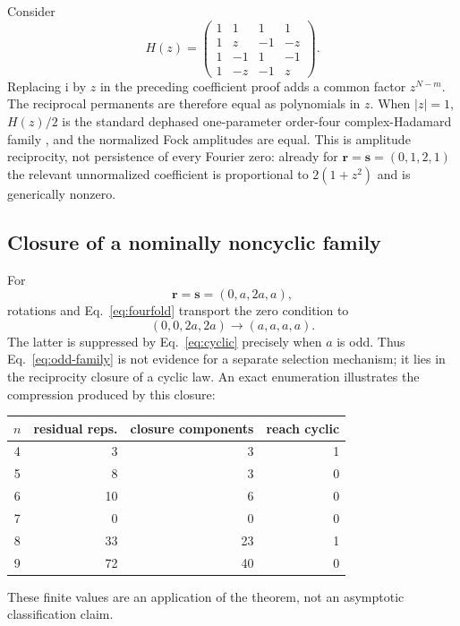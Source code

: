 \documentclass[aps,pra,reprint,amsmath,amssymb,superscriptaddress,longbibliography]{revtex4-2}
\newcommand{\ii}{\mathrm{i}}
\begin{document}
Consider
\begin{equation}
H(z)=
\begin{pmatrix}
1&1&1&1\\
1&z&-1&-z\\
1&-1&1&-1\\
1&-z&-1&z
\end{pmatrix}.
\label{eq:hz}
\end{equation}
Replacing $\ii$ by $z$ in the preceding coefficient proof adds a common
factor $z^{N-m}$.  The reciprocal permanents are therefore equal as
polynomials in $z$.  When $|z|=1$, $H(z)/2$ is the standard dephased
one-parameter order-four complex-Hadamard family
\cite{TadejZyczkowski2006}, and the normalized Fock amplitudes are equal.
This is amplitude reciprocity, not persistence of every Fourier zero:
already for $\bm r=\bm s=(0,1,2,1)$ the relevant unnormalized coefficient
is proportional to $2(1+z^2)$ and is generically nonzero.

\subsection{Closure of a nominally noncyclic family}

For
\begin{equation}
\bm r=\bm s=(0,a,2a,a),
\label{eq:odd-family}
\end{equation}
rotations and Eq.~\eqref{eq:fourfold} transport the zero condition to
\begin{equation}
(0,0,2a,2a)\longrightarrow(a,a,a,a).
\end{equation}
The latter is suppressed by Eq.~\eqref{eq:cyclic} precisely when $a$ is
odd.  Thus Eq.~\eqref{eq:odd-family} is not evidence for a separate
selection mechanism; it lies in the reciprocity closure of a cyclic law.
An exact enumeration illustrates the compression produced by this closure:
\begin{center}
\begin{tabular}{crrr}
\toprule
$n$ & residual reps. & closure components & reach cyclic\\
\midrule
4&3&3&1\\
5&8&3&0\\
6&10&6&0\\
7&0&0&0\\
8&33&23&1\\
9&72&40&0\\
\bottomrule
\end{tabular}
\end{center}
These finite values are an application of the theorem, not an asymptotic
classification claim.
\end{document}
